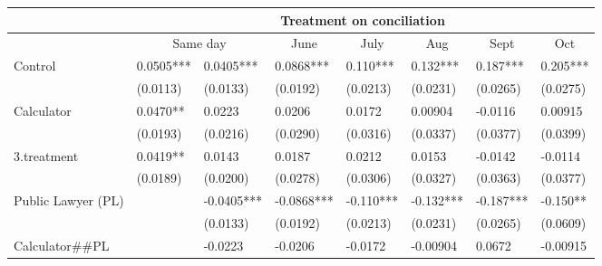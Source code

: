 \begin{tabular}{lrrrrrrr}
\toprule
      & \multicolumn{7}{c}{Treatment on conciliation} \\
\midrule
      & \multicolumn{2}{c}{Same day} & \multicolumn{1}{c}{June} & \multicolumn{1}{c}{July } & \multicolumn{1}{c}{Aug} & \multicolumn{1}{c}{Sept} & \multicolumn{1}{c}{Oct} \\
Control & \multicolumn{1}{l}{0.0505***} & \multicolumn{1}{l}{0.0405***} & \multicolumn{1}{l}{0.0868***} & \multicolumn{1}{l}{0.110***} & \multicolumn{1}{l}{0.132***} & \multicolumn{1}{l}{0.187***} & \multicolumn{1}{l}{0.205***} \\
      & \multicolumn{1}{l}{(0.0113)} & \multicolumn{1}{l}{(0.0133)} & \multicolumn{1}{l}{(0.0192)} & \multicolumn{1}{l}{(0.0213)} & \multicolumn{1}{l}{(0.0231)} & \multicolumn{1}{l}{(0.0265)} & \multicolumn{1}{l}{(0.0275)} \\
Calculator & \multicolumn{1}{l}{0.0470**} & \multicolumn{1}{l}{0.0223} & \multicolumn{1}{l}{0.0206} & \multicolumn{1}{l}{0.0172} & \multicolumn{1}{l}{0.00904} & \multicolumn{1}{l}{-0.0116} & \multicolumn{1}{l}{0.00915} \\
      & \multicolumn{1}{l}{(0.0193)} & \multicolumn{1}{l}{(0.0216)} & \multicolumn{1}{l}{(0.0290)} & \multicolumn{1}{l}{(0.0316)} & \multicolumn{1}{l}{(0.0337)} & \multicolumn{1}{l}{(0.0377)} & \multicolumn{1}{l}{(0.0399)} \\
3.treatment & \multicolumn{1}{l}{0.0419**} & \multicolumn{1}{l}{0.0143} & \multicolumn{1}{l}{0.0187} & \multicolumn{1}{l}{0.0212} & \multicolumn{1}{l}{0.0153} & \multicolumn{1}{l}{-0.0142} & \multicolumn{1}{l}{-0.0114} \\
      & \multicolumn{1}{l}{(0.0189)} & \multicolumn{1}{l}{(0.0200)} & \multicolumn{1}{l}{(0.0278)} & \multicolumn{1}{l}{(0.0306)} & \multicolumn{1}{l}{(0.0327)} & \multicolumn{1}{l}{(0.0363)} & \multicolumn{1}{l}{(0.0377)} \\
Public Lawyer (PL) & \multicolumn{1}{l}{} & \multicolumn{1}{l}{-0.0405***} & \multicolumn{1}{l}{-0.0868***} & \multicolumn{1}{l}{-0.110***} & \multicolumn{1}{l}{-0.132***} & \multicolumn{1}{l}{-0.187***} & \multicolumn{1}{l}{-0.150**} \\
      & \multicolumn{1}{l}{} & \multicolumn{1}{l}{(0.0133)} & \multicolumn{1}{l}{(0.0192)} & \multicolumn{1}{l}{(0.0213)} & \multicolumn{1}{l}{(0.0231)} & \multicolumn{1}{l}{(0.0265)} & \multicolumn{1}{l}{(0.0609)} \\
Calculator\#\#PL & \multicolumn{1}{l}{} & \multicolumn{1}{l}{-0.0223} & \multicolumn{1}{l}{-0.0206} & \multicolumn{1}{l}{-0.0172} & \multicolumn{1}{l}{-0.00904} & \multicolumn{1}{l}{0.0672} & \multicolumn{1}{l}{-0.00915} \\

\end{tabular}
